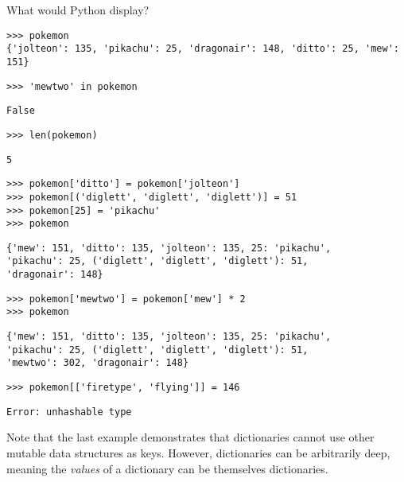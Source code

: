 \question What would Python display?

\begin{lstlisting}
>>> pokemon
{'jolteon': 135, 'pikachu': 25, 'dragonair': 148, 'ditto': 25, 'mew': 151}
\end{lstlisting}

\lstinline{>>> 'mewtwo' in pokemon}
\begin{solution}[0.4in]
\lstinline{False}
\end{solution}

\lstinline{>>> len(pokemon)}
\begin{solution}[0.4in]
\lstinline{5}
\end{solution}

\begin{lstlisting}
>>> pokemon['ditto'] = pokemon['jolteon']
>>> pokemon[('diglett', 'diglett', 'diglett')] = 51
>>> pokemon[25] = 'pikachu'
>>> pokemon
\end{lstlisting}
\begin{solution}[0.7in]
\begin{lstlisting}
{'mew': 151, 'ditto': 135, 'jolteon': 135, 25: 'pikachu',
'pikachu': 25, ('diglett', 'diglett', 'diglett'): 51,
'dragonair': 148}
\end{lstlisting}
\end{solution}

\begin{lstlisting}
>>> pokemon['mewtwo'] = pokemon['mew'] * 2
>>> pokemon
\end{lstlisting}
\begin{solution}[0.4in]
\begin{lstlisting}
{'mew': 151, 'ditto': 135, 'jolteon': 135, 25: 'pikachu',
'pikachu': 25, ('diglett', 'diglett', 'diglett'): 51,
'mewtwo': 302, 'dragonair': 148}
\end{lstlisting}
\end{solution}

\lstinline{>>> pokemon[['firetype', 'flying']] = 146}
\begin{solution}[0.4in]
\lstinline{Error: unhashable type}
\end{solution}

Note that the last example demonstrates that dictionaries cannot use
other mutable data structures as keys. However, dictionaries can be
arbitrarily deep, meaning the {\it values} of a dictionary can be
themselves dictionaries.
